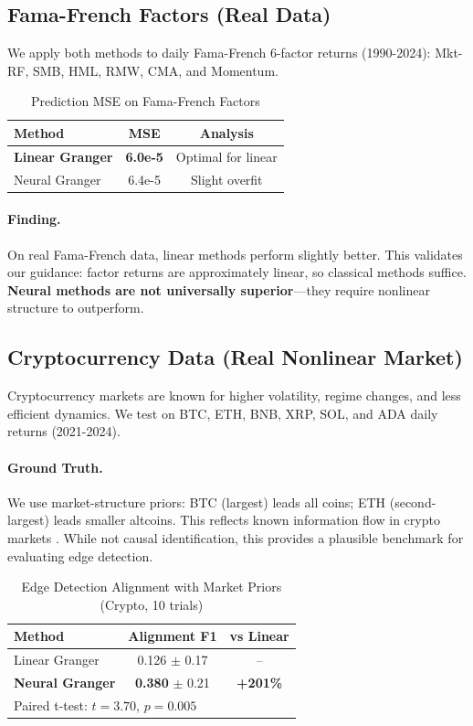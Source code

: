 \documentclass[sigconf,nonacm]{acmart}
\begin{document}
\subsection{Fama-French Factors (Real Data)}
We apply both methods to daily Fama-French 6-factor returns (1990-2024):
Mkt-RF, SMB, HML, RMW, CMA, and Momentum.

\begin{table}[h]
\centering
\caption{Prediction MSE on Fama-French Factors}
\begin{tabular}{lcc}
\toprule
\textbf{Method} & \textbf{MSE} & \textbf{Analysis} \\
\midrule
\textbf{Linear Granger} & \textbf{6.0e-5} & Optimal for linear \\
Neural Granger & 6.4e-5 & Slight overfit \\
\bottomrule
\end{tabular}
\label{tab:ff}
\end{table}

\paragraph{Finding.} On real Fama-French data, linear methods perform slightly better. This validates our guidance: factor returns are approximately linear, so classical methods suffice. \textbf{Neural methods are not universally superior}---they require nonlinear structure to outperform.

\subsection{Cryptocurrency Data (Real Nonlinear Market)}
Cryptocurrency markets are known for higher volatility, regime changes, and less efficient dynamics. We test on BTC, ETH, BNB, XRP, SOL, and ADA daily returns (2021-2024).

\paragraph{Ground Truth.} We use market-structure priors: BTC (largest) leads all coins; ETH (second-largest) leads smaller altcoins. This reflects known information flow in crypto markets \cite{corbet2018cryptocurrencies}. While not causal identification, this provides a plausible benchmark for evaluating edge detection.

\begin{table}[h]
\centering
\caption{Edge Detection Alignment with Market Priors (Crypto, 10 trials)}
\begin{tabular}{lcc}
\toprule
\textbf{Method} & \textbf{Alignment F1} & \textbf{vs Linear} \\
\midrule
Linear Granger & 0.126 $\pm$ 0.17 & -- \\
\textbf{Neural Granger} & \textbf{0.380} $\pm$ 0.21 & \textbf{+201\%} \\
\bottomrule
\multicolumn{3}{l}{\small Paired t-test: $t=3.70$, $p=0.005$}
\end{tabular}
\label{tab:crypto}
\end{table}
\end{document}
